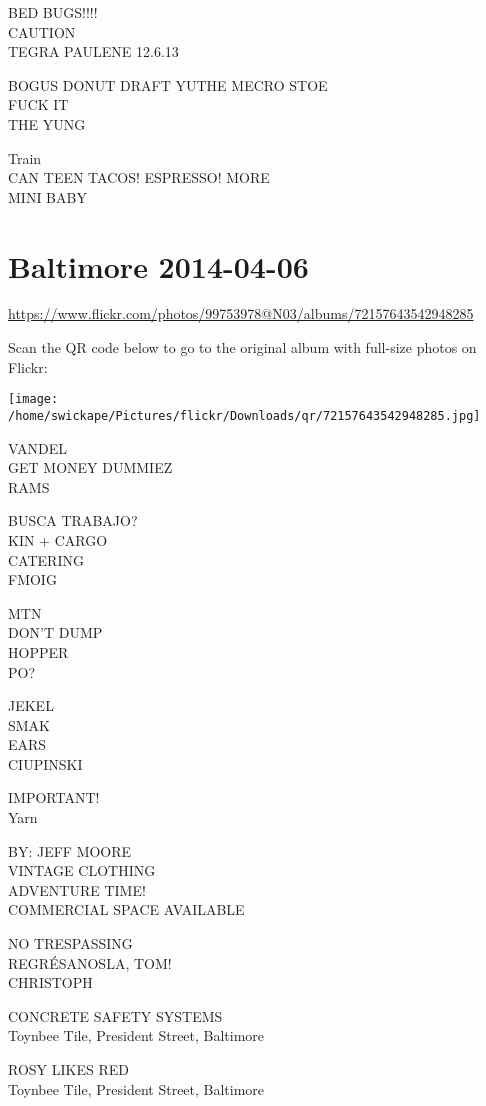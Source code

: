 \documentclass[10pt,letterpaper]{article}
\begin{document}
BED BUGS!!!!\\
CAUTION\\
TEGRA PAULENE 12.6.13

BOGUS DONUT DRAFT YUTHE MECRO STOE\\
FUCK IT\\
THE YUNG

Train\\
CAN TEEN TACOS! ESPRESSO! MORE\\
MINI BABY
\pagebreak

\section*{Baltimore 2014-04-06}

\url{https://www.flickr.com/photos/99753978@N03/albums/72157643542948285}

Scan the QR code below to go to the original album with full-size photos on Flickr:

\texttt{[image: /home/swickape/Pictures/flickr/Downloads/qr/72157643542948285.jpg]}
\pagebreak

VANDEL\\
GET MONEY DUMMIEZ\\
RAMS

BUSCA TRABAJO?\\
KIN + CARGO\\
CATERING\\
FMOIG

MTN\\
DON'T DUMP\\
HOPPER\\
PO?

JEKEL\\
SMAK\\
EARS\\
CIUPINSKI

IMPORTANT!\\
Yarn

BY: JEFF MOORE\\
VINTAGE CLOTHING\\
ADVENTURE TIME!\\
COMMERCIAL SPACE AVAILABLE

NO TRESPASSING\\
REGRÉSANOSLA, TOM!\\
CHRISTOPH

CONCRETE SAFETY SYSTEMS\\
Toynbee Tile, President Street, Baltimore

ROSY LIKES RED\\
Toynbee Tile, President Street, Baltimore
\end{document}

